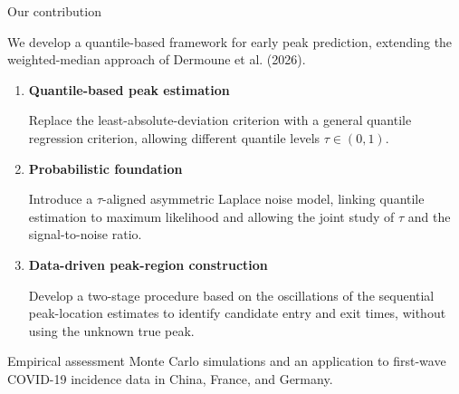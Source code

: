 \documentclass[aspectratio=54,10pt]{beamer}
\begin{document}
\begin{frame}{Our contribution}
	
	We develop a quantile-based framework for early peak
	prediction, extending the weighted-median approach of
	Dermoune et al. (2026).
	
	\vspace{0.2cm}
	
	\begin{enumerate}
		
		\item \textbf{Quantile-based peak estimation}
		
		Replace the least-absolute-deviation criterion with
		a general quantile regression criterion, allowing
		different quantile levels $\tau\in(0,1)$.
		
		\vspace{0.2cm}
		
		\item \textbf{Probabilistic foundation}
		
		Introduce a $\tau$-aligned asymmetric Laplace noise
		model, linking quantile estimation to maximum
		likelihood and allowing the joint study of $\tau$
		and the signal-to-noise ratio.
		
		\vspace{0.2cm}
		
		\item \textbf{Data-driven peak-region construction}
		
		Develop a two-stage procedure based on the oscillations
		of the sequential peak-location estimates to identify
		candidate entry and exit times, without using the
		unknown true peak.
		
	\end{enumerate}
	
	\vspace{0.25cm}
	
	\begin{block}{Empirical assessment}
		Monte Carlo simulations and an application to first-wave
		COVID-19 incidence data in China, France, and Germany.
	\end{block}
	
\end{frame}

\end{document}
